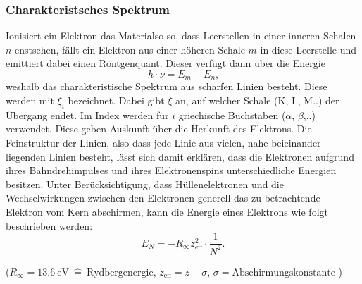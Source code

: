 \subsubsection{Charakteristsches Spektrum}
Ionisiert ein Elektron das Materialso so, dass Leerstellen in einer inneren Schalen $n$ enstsehen, fällt ein Elektron aus einer höheren Schale $m$ in diese Leerstelle und emittiert dabei einen Röntgenquant.
Dieser verfügt dann über die Energie
\begin{equation}
  h \cdot \nu = E_m-E_n \text{,}
\end{equation}
weshalb das charakteristische Spektrum aus scharfen Linien besteht.
Diese werden mit $\xi_i$ bezeichnet. Dabei gibt $\xi$ an, auf welcher Schale (K, L, M..) der Übergang endet. Im Index werden für $i$ griechische Buchstaben ($\alpha$, $\beta$,..) verwendet.
Diese geben Auskunft über die Herkunft des Elektrons.
Die Feinstruktur der Linien, also dass jede Linie aus vielen, nahe beieinander liegenden Linien besteht, lässt sich damit erklären, dass die Elektronen aufgrund ihres Bahndrehimpulses und ihres
Elektronenspins unterschiedliche Energien besitzen.
Unter Berücksichtigung, dass Hüllenelektronen und die Wechselwirkungen zwischen den Elektronen generell das zu betrachtende Elektron vom Kern abschirmen,
kann die Energie eines Elektrons wie folgt beschrieben werden:
\begin{equation}
  E_N=-R_\infty z_\text{eff}^2 \cdot \frac{1}{N^2} \text{.}
\end{equation}
\begin{center}
 \tiny {($R_\infty=\SI{13.6}{\eV} \: \hat{=} \: \text{Rydbergenergie}$, $z_\text{eff}=z-\sigma$, $\sigma=\text{Abschirmungskonstante}$ )}
\end{center}

